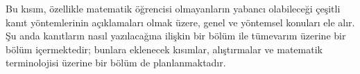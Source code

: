 


\begin{editorial}
  Bu kısım, özellikle matematik öğrencisi olmayanların yabancı
  olabileceği çeşitli kanıt yöntemlerinin açıklamaları olmak üzere,
  genel ve yöntemsel konuları ele alır. Şu anda kanıtların nasıl
  yazılacağına ilişkin bir bölüm ile tümevarım üzerine bir bölüm
  içermektedir; bunlara eklenecek kısımlar, alıştırmalar ve matematik
  terminolojisi üzerine bir bölüm de planlanmaktadır.
\end{editorial}



\OLEndPartHook

